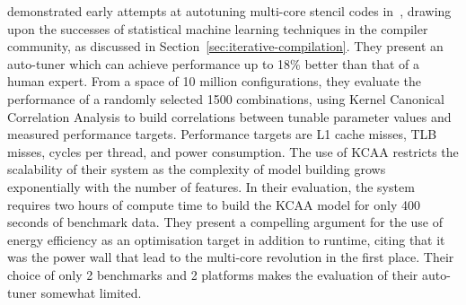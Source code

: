 

%

\citeauthor{Ganapathi2009} demonstrated early attempts at autotuning multi-core stencil codes in~\cite{Ganapathi2009}, drawing upon the successes of statistical machine learning techniques in the compiler community, as discussed in Section~\ref{sec:iterative-compilation}. They present an auto-tuner which can achieve performance up to 18\% better than that of a human expert. From a space of 10 million configurations, they evaluate the performance of a randomly selected 1500 combinations, using Kernel Canonical Correlation Analysis to build correlations between tunable parameter values and measured performance targets. Performance targets are L1 cache misses, TLB misses, cycles per thread, and power consumption. The use of KCAA restricts the scalability of their system as the complexity of model building grows exponentially with the number of features. In their evaluation, the system requires two hours of compute time to build the KCAA model for only 400 seconds of benchmark data. They present a compelling argument for the use of energy efficiency as an optimisation target in addition to runtime, citing that it was the power wall that lead to the multi-core revolution in the first place. Their choice of only 2 benchmarks and 2 platforms makes the evaluation of their auto-tuner somewhat limited.

